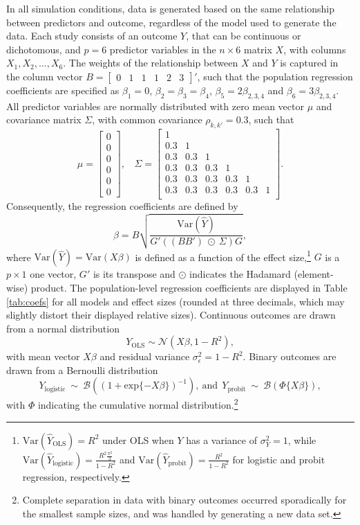 \documentclass[review, 3p, authoryear]{elsarticle} %
\begin{document}
In all simulation conditions, data is generated based on the same relationship between predictors and outcome, regardless of the model used to generate the data.
Each study consists of an outcome \(Y\), that can be continuous or dichotomous, and \(p = 6\) predictor variables in the \(n \times 6\) matrix \(X\), with columns \(X_1, X_2, \dots, X_6\).
The weights of the relationship between \(X\) and \(Y\) is captured in the column vector \(B = \begin{bmatrix} 0 & 1 & 1 & 1 & 2 & 3 \end{bmatrix}'\), such that the population regression coefficients are specified as \(\beta_1 = 0\), \(\beta_2 = \beta_3 = \beta_4\), \(\beta_5 = 2\beta_{2,3,4}\) and \(\beta_6 = 3\beta_{2,3,4}\).
All predictor variables are normally distributed with zero mean vector \(\mu\) and covariance matrix \(\Sigma\), with common covariance \(\rho_{k,k'}=0.3\), such that
\[
\mu = 
\begin{bmatrix}
0 \\ 0 \\ 0 \\ 0 \\ 0 \\ 0
\end{bmatrix}, 
~~~~
\Sigma = 
\begin{bmatrix}
1 &  &  &  &  &  \\ 
0.3 & 1 &  &  &  &  \\ 
0.3 & 0.3 & 1 &  &  &  \\ 
0.3 & 0.3 & 0.3 & 1 &  &  \\ 
0.3 & 0.3 & 0.3 & 0.3 & 1 &  \\ 
0.3 & 0.3 & 0.3 & 0.3 & 0.3 & 1  \\ 
\end{bmatrix}.
\]
Consequently, the regression coefficients are defined by
\[
\beta = B 
  \sqrt{
    \frac{\text{Var}(\hat{Y})}{G'((BB')~\odot~\Sigma)G}
  },
\]
where \(\text{Var}(\hat{Y}) = \text{Var}(X\beta)\) is defined as a function of the effect size,\footnote{
  \(\text{Var}(\hat{Y}_{\text{OLS}}) = R^2\) under OLS when \(Y\) has a variance of \(\sigma_Y^2 = 1\), while \(\text{Var}(\hat{Y}_{\text{logistic}}) = \frac{R^2\frac{\pi^2}{3}}{1 - R^2}\) and \(\text{Var}(\hat{Y}_{\text{probit}}) = \frac{R^2}{1-R^2}\) for logistic and probit regression, respectively.}
\(G\) is a \(p \times 1\) one vector, \(G'\) is its transpose and \(\odot\) indicates the Hadamard (element-wise) product.
The population-level regression coefficients are displayed in Table \ref{tab:coefs} for all models and effect sizes (rounded at three decimals, which may slightly distort their displayed relative sizes).
Continuous outcomes are drawn from a normal distribution
\[
Y_{\text{OLS}} \sim \mathcal{N}(X\beta, 1 - R^2),
\]
with mean vector \(X\beta\) and residual variance \(\sigma_{\epsilon}^2=1-R^2\).
Binary outcomes are drawn from a Bernoulli distribution
\[
Y_{\text{logistic}} ~ \sim ~ \mathcal{B}((1 + \text{exp}\{-X\beta\})^{-1}), 
~ \text{and} ~~
Y_{\text{probit}} ~ \sim ~ \mathcal{B}(\Phi\{X\beta\}),
\]
with \(\Phi\) indicating the cumulative normal distribution.\footnote{Complete separation in data with binary outcomes occurred sporadically for the smallest sample sizes, and was handled by generating a new data set.}
\end{document}

